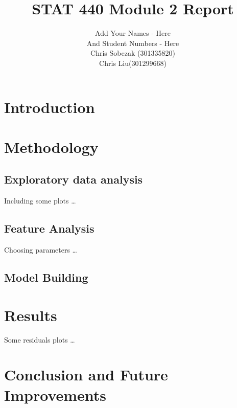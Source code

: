 \documentclass{article}
\author{
	Add Your Names - Here\\
	And Student Numbers - Here\\
	Chris Sobczak (301335820) \\
	Chris Liu(301299668)
}
\title{STAT 440 Module 2 Report}
\begin{document}
\maketitle

\section{Introduction}

\section{Methodology}

\subsection{Exploratory data analysis}

Including some plots \dots

\subsection{Feature Analysis}

Choosing parameters \dots

\subsection{Model Building}

\section{Results}

Some residuals plots \dots

\section{Conclusion and Future Improvements}

\printbibliography
\end{document}
